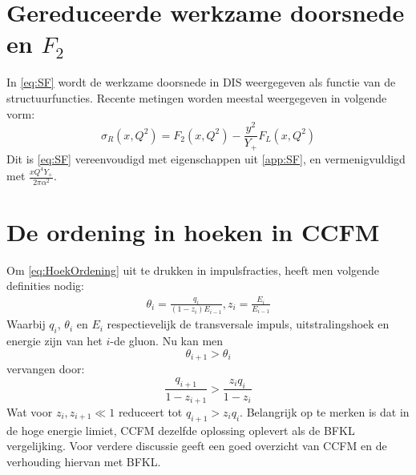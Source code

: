 \documentclass[a4paper,11pt]{article}
\numberwithin{equation}{section} %
\begin{document}
\section{Gereduceerde werkzame doorsnede en $F_2$} \label{app:SigmaR}
In \eqref{eq:SF} wordt de werkzame doorsnede in DIS weergegeven als functie van de structuurfuncties.
Recente metingen worden meestal weergegeven in volgende vorm:
\begin{equation}
\sigma_{R} (x, Q^2) = F_2(x,Q^2)-\frac{y^2}{Y_+} F_L(x,Q^2)
\end{equation}
Dit is \eqref{eq:SF} vereenvoudigd met eigenschappen uit \ref{app:SF}, en vermenigvuldigd met $\frac{xQ^4 Y_+}{2\pi \alpha^2}$.

\section{De ordening in hoeken in CCFM} \label{app:CCFM}
Om \eqref{eq:HoekOrdening} uit te drukken in impulsfracties, heeft men volgende definities nodig:
\begin{align}
\theta_i = \frac{q_i}{(1-z_i)E_{i-1}}, z_i = \frac{E_i}{E_{i-1}}
\end{align}
Waarbij $q_i$, $\theta_i$ en $E_i$ respectievelijk de transversale impuls, uitstralingshoek en energie zijn van het $i$-de gluon.
Nu kan men
\begin{equation}
\theta_{i+1} > \theta_i
\end{equation}
 vervangen door:
\begin{equation}
 \frac{q_{i+1}}{1-z_{i+1}} > \frac{z_i q_i}{1-z_i}
\end{equation}
Wat voor $z_i, z_{i+1} \ll 1$ reduceert tot $q_{i+1} > z_i q_i$.
Belangrijk op te merken is dat in de hoge energie limiet, CCFM dezelfde oplossing oplevert als de BFKL vergelijking.
Voor verdere discussie geeft \cite{Vera} een goed overzicht van CCFM en de verhouding hiervan met BFKL.
\end{document}
